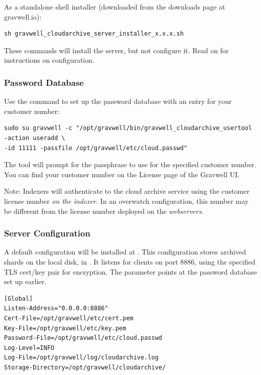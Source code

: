 {{As a standalone shell installer (downloaded from the downloads page at gravwell.io):

\begin{verbatim}
sh gravwell_cloudarchive_server_installer_x.x.x.sh
\end{verbatim}

These commands will install the server, but not configure it. Read on for instructions on configuration.

\subsubsection{Password Database}

Use the  command to set up the password database with an entry for your customer number:

\begin{verbatim}
sudo su gravwell -c "/opt/gravwell/bin/gravwell_cloudarchive_usertool -action useradd \
-id 11111 -passfile /opt/gravwell/etc/cloud.passwd"
\end{verbatim}

The tool will prompt for the passphrase to use for the specified customer number. You can find your customer number on the License page of the Gravwell UI.

Note: Indexers will authenticate to the cloud archive service using the customer license number \emph{on the indexer}. In an overwatch configuration, this number may be different from the license number deployed on the \emph{webservers}.

\subsubsection{Server Configuration}

A default configuration will be installed at . This configuration stores archived shards on the local disk, in . It listens for clients on port 8886, using the specified TLS cert/key pair for encryption. The  parameter points at the password database set up earlier.

\begin{verbatim}
[Global]
Listen-Address="0.0.0.0:8886"
Cert-File=/opt/gravwell/etc/cert.pem
Key-File=/opt/gravwell/etc/key.pem
Password-File=/opt/gravwell/etc/cloud.passwd
Log-Level=INFO
Log-File=/opt/gravwell/log/cloudarchive.log
Storage-Directory=/opt/gravwell/cloudarchive/
\end{verbatim}

}}
